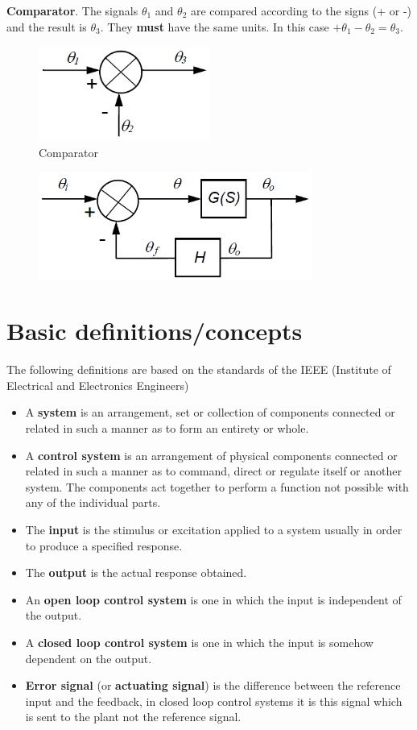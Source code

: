 \documentclass[class=report, crop=false, 12pt,a4paper]{standalone}
\begin{document}
\textbf{Comparator}. The signals $\theta_1$ and $\theta_2$ are compared according to the signs (+ or -) and the result is $\theta_3$. They \textbf{must} have the same units. In this case $+\theta_1 - \theta_2 = \theta_3$.
\begin{figure}[H]
  \centering
  \includegraphics[width = 0.5\textwidth]{../img/comparator.png}
  \caption{Comparator}
\end{figure}
\begin{figure}[H]
  \centering
  \includegraphics[width = 0.8\textwidth]{../img/blockdiagram3.png}
\end{figure}
\section{Basic definitions/concepts}
The following definitions are based on the standards of the IEEE (Institute of Electrical and Electronics Engineers)
\begin{itemize}
  \item A \textbf{system} is an arrangement, set or collection of components connected or related in such a manner as to form an entirety or whole.
  \item A \textbf{control system} is an arrangement of physical components connected or related in such a manner as to command, direct or regulate itself or another system. The components act together to perform a function not possible with any of the individual parts. 
  \item The \textbf{input} is the stimulus or excitation applied to a system usually in order to produce a specified response.
  \item The \textbf{output} is the actual response obtained.
  \item An \textbf{open loop control system} is one in which the input is independent of the output.
  \item A \textbf{closed loop control system} is one in which the input is somehow dependent on the output.
  \item \textbf{Error signal} (or \textbf{actuating signal}) is the difference between the reference input and the feedback, in closed loop control systems it is this signal which is sent to the plant not the reference signal.
\end{itemize}
\end{document}
